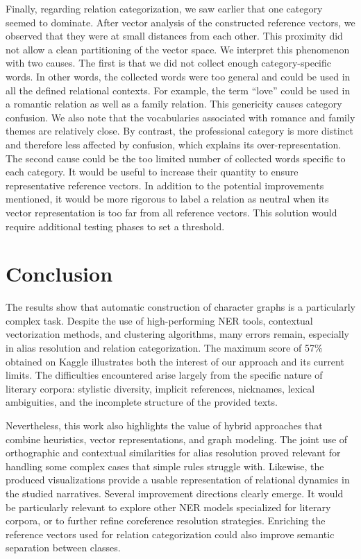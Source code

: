 \documentclass[a4paper]{article}
\begin{document}
Finally, regarding relation categorization, we saw earlier that one category seemed to dominate. After vector analysis of the constructed reference vectors, we observed that they were at small distances from each other. This proximity did not allow a clean partitioning of the vector space. We interpret this phenomenon with two causes. The first is that we did not collect enough category-specific words. In other words, the collected words were too general and could be used in all the defined relational contexts. For example, the term “love” could be used in a romantic relation as well as a family relation. This genericity causes category confusion. We also note that the vocabularies associated with romance and family themes are relatively close. By contrast, the professional category is more distinct and therefore less affected by confusion, which explains its over-representation. The second cause could be the too limited number of collected words specific to each category. It would be useful to increase their quantity to ensure representative reference vectors. In addition to the potential improvements mentioned, it would be more rigorous to label a relation as neutral when its vector representation is too far from all reference vectors. This solution would require additional testing phases to set a threshold.

\section{Conclusion}

The results show that automatic construction of character graphs is a particularly complex task. Despite the use of high-performing NER tools, contextual vectorization methods, and clustering algorithms, many errors remain, especially in alias resolution and relation categorization. The maximum score of 57\% obtained on Kaggle illustrates both the interest of our approach and its current limits. The difficulties encountered arise largely from the specific nature of literary corpora: stylistic diversity, implicit references, nicknames, lexical ambiguities, and the incomplete structure of the provided texts.

Nevertheless, this work also highlights the value of hybrid approaches that combine heuristics, vector representations, and graph modeling. The joint use of orthographic and contextual similarities for alias resolution proved relevant for handling some complex cases that simple rules struggle with. Likewise, the produced visualizations provide a usable representation of relational dynamics in the studied narratives. Several improvement directions clearly emerge. It would be particularly relevant to explore other NER models specialized for literary corpora, or to further refine coreference resolution strategies. Enriching the reference vectors used for relation categorization could also improve semantic separation between classes.
\end{document}
